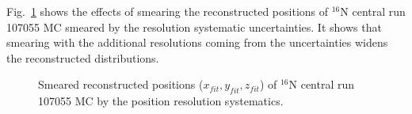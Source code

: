 Fig.~\ref{fig:smearXYZresol} shows the effects of smearing the reconstructed positions of $^{16}$N central run 107055 MC smeared by the resolution systematic uncertainties. It shows that smearing with the additional resolutions coming from the uncertainties widens the reconstructed distributions.
 
\begin{figure}
	\centering
	\caption[Smeared reconstructed positions of $^{16}$N central run 107055 MC.]{Smeared reconstructed positions ($x_{fit},y_{fit},z_{fit}$) of $^{16}$N central run 107055 MC by the position resolution systematics.\label{fig:smearXYZresol}}
\end{figure}

